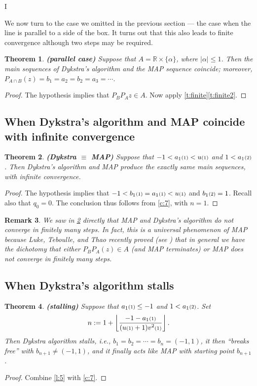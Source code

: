 I\documentclass[12pt]{article}
\newcommand{\RR}{\ensuremath{\mathbb R}}
\newtheorem{theorem}{Theorem}[section]
\newtheorem{remark}[theorem]{Remark}
\providecommand{\RR}{\mathbb{R}}
\providecommand{\RR}{\mathbb{R}}
\newcommand{\kkk}[1]{\ensuremath{\textstyle\mathsmaller{({#1})}}}
\newcommand{\eins}{\ensuremath{\textstyle\mathsmaller{({1})}}}
\newcommand{\zwei}{\ensuremath{\textstyle\mathsmaller{({2})}}}
\begin{document}
We now turn to the case we omitted in the previous section 
--- the case when the line is parallel to a side of the box. 
It turns out that this also leads to 
finite convergence although two steps may be required. 

\begin{theorem} {\rm\bf (parallel case)}
Suppose that $A = \RR\times\{\alpha\}$, where $|\alpha|\leq 1$.
Then the main sequences of Dykstra's algorithm  and the MAP sequence
coincide; moreover, 
$P_{A\cap B}(z) = b_1=a_2=b_2=a_3=\cdots$.
\end{theorem}
\begin{proof}
The hypothesis implies that $P_BP_Az\in A$.
Now apply \cref{t:finite}\cref{t:finite2}.
\end{proof}


\subsection*{When Dykstra's algorithm and MAP coincide with infinite convergence}


\begin{theorem} {\rm\bf (Dykstra $\equiv$ MAP)}
  \label{t:hard}
Suppose that $-1<a_1\eins<u\eins$ and $1 < a_1\zwei$.
Then Dykstra's algorithm and MAP produce the exactly same main sequences,
with infinite convergence. 
\end{theorem}
\begin{proof}
The hypothesis implies that $-1<b_1\eins = a_1\eins<u\eins$ and
$b_1\zwei=1$. Recall also that $q_0=0$. 
The conclusion thus follows from \cref{c:7}, with $n=1$.
\end{proof}

\begin{remark}
We saw in \cref{t:hard} directly that MAP and Dykstra's algorithm do 
not converge in finitely many steps.
In fact, this is a universal phenomenon of MAP because
Luke, Teboulle, and Thao recently proved (see \cite[Theorem~7]{Luke}) that
\emph{in general} we have the dichotomy that
either $P_BP_A(z)\in A$ (and MAP terminates) or 
MAP does not converge in finitely many steps. 
\end{remark}

\subsection*{When Dykstra's algorithm stalls}


\begin{theorem}{\rm\bf (stalling)}
\label{t:stall}
Suppose that 
$a_1\eins\leq-1$ and $1< a_1\zwei$. 
Set 
\begin{equation}
n := 1+ \left\lfloor \frac{\displaystyle -1-a_1\kkk{1}}{\displaystyle(u\kkk{1}+1)v^2\kkk{1}} \right\rfloor.
\end{equation}
Then Dykstra algorithm stalls, i.e.,  $b_1 = b_2 = \cdots = b_n = (-1,1)$,
it then ``breaks free'' with $b_{n+1}\neq (-1,1)$, and 
it finally acts like MAP with starting point $b_{n+1}$.
\end{theorem}
\begin{proof}
Combine \cref{l:5} with \cref{c:7}. 
\end{proof}
\end{document}
